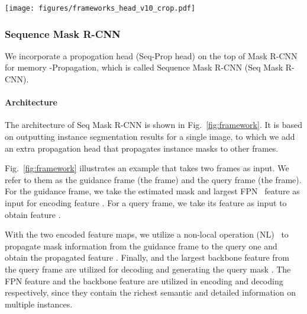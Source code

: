 \documentclass[10pt,twocolumn,letterpaper]{article}
\begin{document}
	\begin{figure*}[t]
		\begin{center}
			\texttt{[image: figures/frameworks\_head\_v10\_crop.pdf]}
		\end{center}
		\caption{Framework of \textbf{Seq Mask R-CNN}. We adopt \textbf{Seq-Prop head} on Mask R-CNN for propagating instance masks from the guidance frame at time  to a query frame at time . ,  are the largest FPN~\cite{lin2017feature} feature of input images, and  is the largest backbone feature. \textbf{NL} is a non-local operation~\cite{wang2018non}. `' denotes  consecutive residual blocks. `' and `' denote matrix multiplication and summation, respectively. Detailed architectures are illustrated in the supplementary files. }
		\label{fig:framework}
		\vspace{-0.1in}
	\end{figure*}
	
	
	\subsubsection{Sequence Mask R-CNN}\label{Sec:SPH}
	We incorporate a propogation head (Seq-Prop head) on the top of Mask R-CNN for memory -Propagation, which is called Sequence Mask R-CNN (Seq Mask R-CNN).
	
	\vspace{-0.1in}
	
	\paragraph{Architecture} The architecture of Seq Mask R-CNN is shown in Fig.~\ref{fig:framework}. It is based on outputting instance segmentation results for a single image, to which we add an extra propagation head that propagates instance masks to other frames.
	
	Fig.~\ref{fig:framework} illustrates an example that takes two frames as input. We refer to them as the guidance frame (the  frame) and the query frame (the  frame). 
	For the guidance frame, we take the estimated mask  and largest FPN~\cite{lin2017feature} feature  as input for encoding feature . For a query frame, we take its  feature as input to obtain feature .
	
	With the two encoded feature maps, we utilize a non-local operation (NL)~\cite{wang2018non} to propagate mask information from the guidance frame to the query one and obtain the propagated feature .
	Finally,  and the largest backbone feature  from the query frame are utilized for decoding and generating the query mask . 
	The FPN feature  and the backbone feature  are utilized in encoding and decoding respectively, since they contain the richest semantic and detailed information on multiple instances.
	
\end{document}
